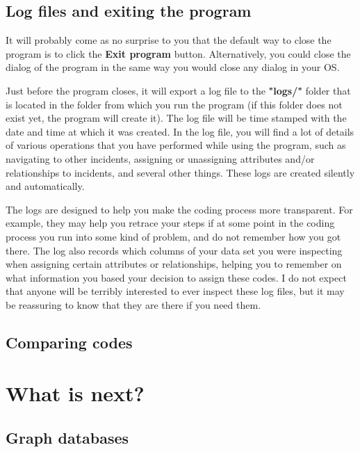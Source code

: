 \documentclass{memoir}
\begin{document}
\section{Log files and exiting the program}
\label{sec:logfilesandexiting}

It will probably come as no surprise to you that the default way to close the program is to click the \textbf{Exit program} button. Alternatively, you could close the dialog of the program in the same way you would close any dialog in your OS.

Just before the program closes, it will export a log file to the \textbf{"logs/"} folder that is located in the folder from which you run the program (if this folder does not exist yet, the program will create it). The log file will be time stamped with the date and time at which it was created. In the log file, you will find a lot of details of various operations that you have performed while using the program, such as navigating to other incidents, assigning or unassigning attributes and/or relationships to incidents, and several other things. These logs are created silently and automatically.

The logs are designed to help you make the coding process more transparent. For example, they may help you retrace your steps if at some point in the coding process you run into some kind of problem, and do not remember how you got there. The log also records which columns of your data set you were inspecting when assigning certain attributes or relationships, helping you to remember on what information you based your decision to assign these codes. I do not expect that anyone will be terribly interested to ever inspect these log files, but it may be reassuring to know that they are there if you need them.  


\section{Comparing codes}
\label{sec:comparingcodes}



\chapter{What is next?}
\label{chap:whatisnext}



\section{Graph databases}
\label{sec:graphdatabases}
\end{document}
